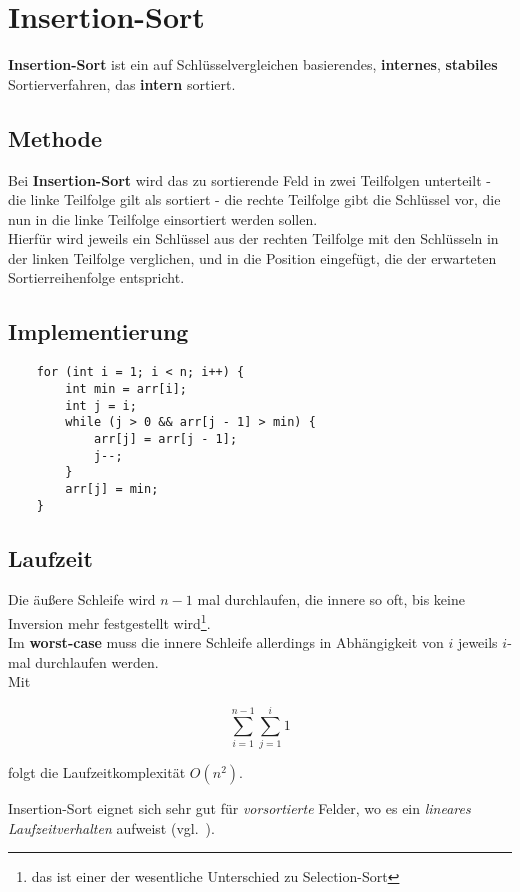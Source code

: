 \section{Insertion-Sort}

\textbf{Insertion-Sort} ist ein auf Schlüsselvergleichen basierendes, \textbf{internes}, \textbf{stabiles} Sortierverfahren, das \textbf{intern} sortiert.

\subsection{Methode}

Bei \textbf{Insertion-Sort} wird das zu sortierende Feld in zwei Teilfolgen unterteilt - die linke Teilfolge gilt als sortiert - die rechte Teilfolge gibt die Schlüssel vor, die nun in die linke Teilfolge einsortiert werden sollen.\\
Hierfür wird jeweils ein Schlüssel aus der rechten Teilfolge mit den Schlüsseln in der linken Teilfolge verglichen, und in die Position eingefügt, die der erwarteten Sortierreihenfolge entspricht.

\subsection{Implementierung}

\begin{verbatim}
    for (int i = 1; i < n; i++) {
        int min = arr[i];
        int j = i;
        while (j > 0 && arr[j - 1] > min) {
            arr[j] = arr[j - 1];
            j--;
        }
        arr[j] = min;
    }
\end{verbatim}

\subsection{Laufzeit}
Die äußere Schleife wird $n-1$ mal durchlaufen, die innere so oft, bis keine Inversion mehr festgestellt wird\footnote{
    das ist einer der wesentliche Unterschied zu Selection-Sort
}.\\
Im \textbf{worst-case} muss die innere Schleife allerdings in Abhängigkeit von $i$ jeweils $i$-mal durchlaufen werden.\\

Mit

\begin{equation}
    \sum_{i = 1}^{n-1} \sum_{j=1}^i 1
\end{equation}

folgt die Laufzeitkomplexität $O(n^2)$.\\

\begin{tcolorbox}[title={Lineares Laufzeitverhalten}]
    Insertion-Sort eignet  sich sehr gut für \textit{vorsortierte} Felder, wo es ein \textit{lineares Laufzeitverhalten} aufweist (vgl.~\cite[188]{CL22}).
\end{tcolorbox}


